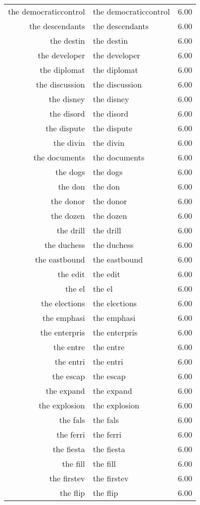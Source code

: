 \begin{table}[ht]
\begin{tabular}{rlr}
  the democraticcontrol & the democraticcontrol & 6.00 \\ 
  the descendants & the descendants & 6.00 \\ 
  the destin & the destin & 6.00 \\ 
  the developer & the developer & 6.00 \\ 
  the diplomat & the diplomat & 6.00 \\ 
  the discussion & the discussion & 6.00 \\ 
  the disney & the disney & 6.00 \\ 
  the disord & the disord & 6.00 \\ 
  the dispute & the dispute & 6.00 \\ 
  the divin & the divin & 6.00 \\ 
  the documents & the documents & 6.00 \\ 
  the dogs & the dogs & 6.00 \\ 
  the don & the don & 6.00 \\ 
  the donor & the donor & 6.00 \\ 
  the dozen & the dozen & 6.00 \\ 
  the drill & the drill & 6.00 \\ 
  the duchess & the duchess & 6.00 \\ 
  the eastbound & the eastbound & 6.00 \\ 
  the edit & the edit & 6.00 \\ 
  the el & the el & 6.00 \\ 
  the elections & the elections & 6.00 \\ 
  the emphasi & the emphasi & 6.00 \\ 
  the enterpris & the enterpris & 6.00 \\ 
  the entre & the entre & 6.00 \\ 
  the entri & the entri & 6.00 \\ 
  the escap & the escap & 6.00 \\ 
  the expand & the expand & 6.00 \\ 
  the explosion & the explosion & 6.00 \\ 
  the fals & the fals & 6.00 \\ 
  the ferri & the ferri & 6.00 \\ 
  the fiesta & the fiesta & 6.00 \\ 
  the fill & the fill & 6.00 \\ 
  the firstev & the firstev & 6.00 \\ 
  the flip & the flip & 6.00 \\ 

\end{tabular}
\end{table}
